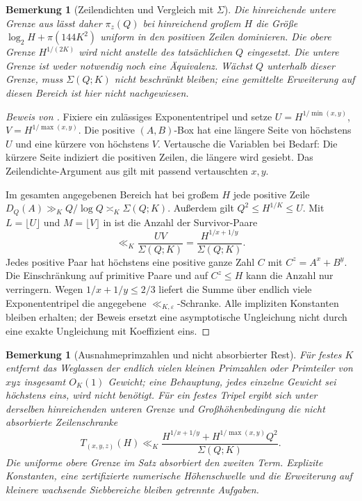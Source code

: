 \documentclass[11pt,a4paper]{article}
\newtheorem{remark}[theorem]{Bemerkung}
\begin{document}
\begin{remark}[Zeilendichten und Vergleich mit $\Sigma$]
Die hinreichende untere Grenze aus  lässt daher
$\pi_z(Q)$ bei hinreichend großem $H$ die Größe
$\log_2 H+\pi(144K^2)$ uniform in den positiven Zeilen dominieren.
Die obere Grenze $H^{1/(2K)}$ wird nicht anstelle des tatsächlichen
$Q$ eingesetzt. Die untere Grenze ist weder notwendig noch eine
Äquivalenz. Wächst $Q$ unterhalb dieser Grenze, muss $\Sigma(Q;K)$
nicht beschränkt bleiben; eine gemittelte Erweiterung auf diesen
Bereich ist hier nicht nachgewiesen.
\end{remark}

\begin{proof}[Beweis von ]
Fixiere ein zulässiges Exponententripel und setze
$U=H^{1/\min(x,y)}$, $V=H^{1/\max(x,y)}$.
Die positive $(A,B)$-Box hat eine längere Seite von höchstens $U$
und eine kürzere von höchstens $V$. Vertausche die Variablen bei
Bedarf: Die kürzere Seite indiziert die positiven Zeilen, die längere
wird gesiebt. Das Zeilendichte-Argument aus
 gilt mit passend vertauschten $x,y$.

Im gesamten angegebenen Bereich hat bei großem $H$ jede positive
Zeile $D_Q(A)\gg_K Q/\log Q\asymp_K\Sigma(Q;K)$.
Außerdem gilt $Q^2\le H^{1/K}\le U$.
Mit $L=\lfloor U\rfloor$ und $M=\lfloor V\rfloor$ in
 ist die Anzahl der Survivor-Paare
\[
 \ll_K\frac{UV}{\Sigma(Q;K)}
       =\frac{H^{1/x+1/y}}{\Sigma(Q;K)}.
\]
Jedes positive Paar hat höchstens eine positive ganze Zahl $C$ mit
$C^z=A^x+B^y$. Die Einschränkung auf primitive Paare und auf
$C^z\le H$ kann die Anzahl nur verringern. Wegen $1/x+1/y\le2/3$
liefert die Summe über endlich viele Exponententripel die angegebene
$\ll_{K,\varepsilon}$-Schranke. Alle impliziten Konstanten bleiben
erhalten; der Beweis ersetzt eine asymptotische Ungleichung nicht
durch eine exakte Ungleichung mit Koeffizient eins.
\end{proof}

\begin{remark}[Ausnahmeprimzahlen und nicht absorbierter Rest]
\label{rem:exceptional}
Für festes $K$ entfernt das Weglassen der endlich vielen kleinen
Primzahlen oder Primteiler von $xyz$ insgesamt $O_K(1)$ Gewicht;
eine Behauptung, jedes einzelne Gewicht sei höchstens eins,
wird nicht benötigt. Für ein festes Tripel ergibt sich unter
derselben hinreichenden unteren Grenze und Großhöhenbedingung
die nicht absorbierte Zeilenschranke
\[
 T_{(x,y,z)}(H)\ll_K
 \frac{H^{1/x+1/y}+H^{1/\max(x,y)}Q^2}{\Sigma(Q;K)}.
\]
Die uniforme obere Grenze im Satz absorbiert den zweiten Term.
Explizite Konstanten, eine zertifizierte numerische Höhenschwelle und
die Erweiterung auf kleinere wachsende Siebbereiche bleiben getrennte
Aufgaben.
\end{remark}
\end{document}
